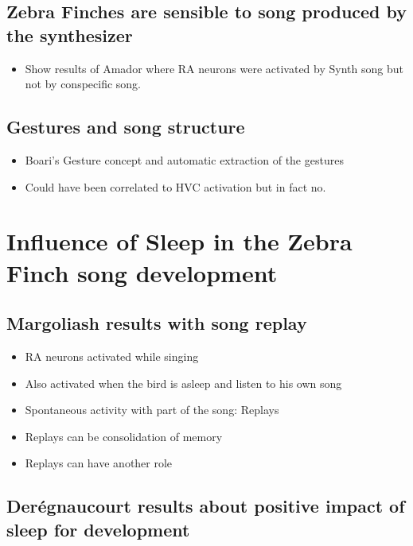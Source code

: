 \subsection{Zebra Finches are sensible to song produced by the
synthesizer}\label{zebra-finches-are-sensible-to-song-produced-by-the-synthesizer}

\begin{itemize}
\tightlist
\item
  Show results of Amador where RA neurons were activated by Synth song
  but not by conspecific song.
\end{itemize}

\subsection{Gestures and song
structure}\label{gestures-and-song-structure}

\begin{itemize}
\tightlist
\item
  Boari's Gesture concept and automatic extraction of the gestures
\item
  Could have been correlated to HVC activation but in fact no.
\end{itemize}

\section{Influence of Sleep in the Zebra Finch song
development}\label{influence-of-sleep-in-the-zebra-finch-song-development}

\subsection{Margoliash results with song
replay}\label{margoliash-results-with-song-replay}

\begin{itemize}
\tightlist
\item
  RA neurons activated while singing
\item
  Also activated when the bird is asleep and listen to his own song
\item
  Spontaneous activity with part of the song: Replays
\item
  Replays can be consolidation of memory
\item
  Replays can have another role
\end{itemize}

\subsection{Derégnaucourt results about positive impact of sleep for
development}\label{deruxe9gnaucourt-results-about-positive-impact-of-sleep-for-development}

